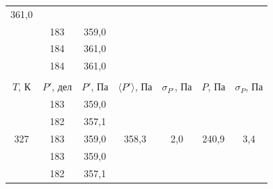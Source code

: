 \documentclass[a4paper,12pt]{article} %
\begin{document}
\begin{table}[H]
\begin{tabular}{ccccccc}
		\multicolumn{1}{c|}{361,0} &
		\multicolumn{1}{c|}{} &
		\multicolumn{1}{c|}{} &
		\multicolumn{1}{c|}{} &
		\multicolumn{1}{c|}{} \\ \cline{2-3}
		\multicolumn{1}{|c|}{} &
		\multicolumn{1}{c|}{183} &
		\multicolumn{1}{c|}{359,0} &
		\multicolumn{1}{c|}{} &
		\multicolumn{1}{c|}{} &
		\multicolumn{1}{c|}{} &
		\multicolumn{1}{c|}{} \\ \cline{2-3}
		\multicolumn{1}{|c|}{} &
		\multicolumn{1}{c|}{184} &
		\multicolumn{1}{c|}{361,0} &
		\multicolumn{1}{c|}{} &
		\multicolumn{1}{c|}{} &
		\multicolumn{1}{c|}{} &
		\multicolumn{1}{c|}{} \\ \cline{2-3}
		\multicolumn{1}{|c|}{} &
		\multicolumn{1}{c|}{184} &
		\multicolumn{1}{c|}{361,0} &
		\multicolumn{1}{c|}{} &
		\multicolumn{1}{c|}{} &
		\multicolumn{1}{c|}{} &
		\multicolumn{1}{c|}{} \\ \hline
		&
		&
		&
		&
		&
		&
		\\ \hline
		\multicolumn{1}{|c|}{$ T $, К} &
		\multicolumn{1}{c|}{$ P' $, дел} &
		\multicolumn{1}{c|}{$ P' $, Па} &
		\multicolumn{1}{c|}{$ \langle P' \rangle $, Па} &
		\multicolumn{1}{c|}{$ \sigma_{P'} $, Па} &
		\multicolumn{1}{c|}{$ P $, Па} &
		\multicolumn{1}{c|}{$ \sigma_P $, Па} \\ \hline
		\multicolumn{1}{|c|}{\multirow{5}{*}{327}} &
		\multicolumn{1}{c|}{183} &
		\multicolumn{1}{c|}{359,0} &
		\multicolumn{1}{c|}{\multirow{5}{*}{358,3}} &
		\multicolumn{1}{c|}{\multirow{5}{*}{2,0}} &
		\multicolumn{1}{c|}{\multirow{5}{*}{240,9}} &
		\multicolumn{1}{c|}{\multirow{5}{*}{3,4}} \\ \cline{2-3}
		\multicolumn{1}{|c|}{} &
		\multicolumn{1}{c|}{182} &
		\multicolumn{1}{c|}{357,1} &
		\multicolumn{1}{c|}{} &
		\multicolumn{1}{c|}{} &
		\multicolumn{1}{c|}{} &
		\multicolumn{1}{c|}{} \\ \cline{2-3}
		\multicolumn{1}{|c|}{} &
		\multicolumn{1}{c|}{183} &
		\multicolumn{1}{c|}{359,0} &
		\multicolumn{1}{c|}{} &
		\multicolumn{1}{c|}{} &
		\multicolumn{1}{c|}{} &
		\multicolumn{1}{c|}{} \\ \cline{2-3}
		\multicolumn{1}{|c|}{} &
		\multicolumn{1}{c|}{183} &
		\multicolumn{1}{c|}{359,0} &
		\multicolumn{1}{c|}{} &
		\multicolumn{1}{c|}{} &
		\multicolumn{1}{c|}{} &
		\multicolumn{1}{c|}{} \\ \cline{2-3}
		\multicolumn{1}{|c|}{} &
		\multicolumn{1}{c|}{182} &
		\multicolumn{1}{c|}{357,1} &
		\multicolumn{1}{c|}{} &
		\multicolumn{1}{c|}{} &
		\multicolumn{1}{c|}{} &
		\multicolumn{1}{c|}{} \\ \hline

\end{tabular}
\end{table}
\end{document}
